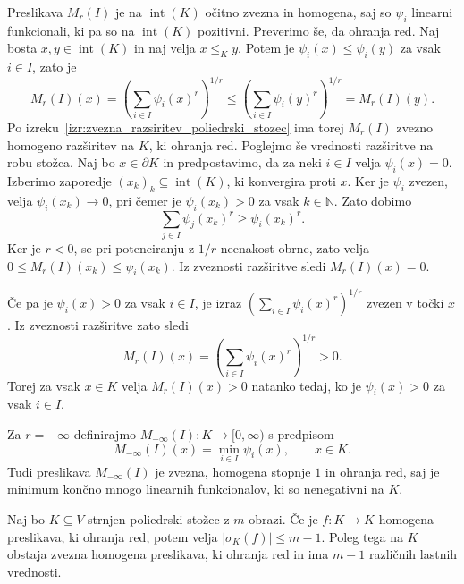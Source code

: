 \documentclass[mat2, tisk]{fmfdelo}
\newcommand{\N}{\mathbb{N}}
\begin{document}
Preslikava $M_r(I)$ je na $\operatorname{int}(K)$ očitno zvezna in homogena, saj so 
$\psi_i$ linearni funkcionali, ki pa so na $\operatorname{int}(K)$ pozitivni.
Preverimo še, da ohranja red. Naj bosta $x,y\in\operatorname{int}(K)$ in naj velja $x\leq_K y$. Potem je $\psi_i(x)\leq\psi_i(y)$ za vsak $i\in I$, zato je
\[
M_r(I)(x)
=
\left(\sum_{i\in I}\psi_i(x)^r\right)^{ 1/r}
\leq
\left(\sum_{i\in I}\psi_i(y)^r\right)^{1/r}
=
M_r(I)(y).
\]
Po izreku~\ref{izr:zvezna_razsiritev_poliedrski_stozec} ima torej $M_r(I)$
zvezno homogeno razširitev na $K$, ki ohranja red.
Poglejmo še vrednosti razširitve na robu stožca. Naj bo $x\in\partial K$
in predpostavimo, da za neki $i\in I$ velja $\psi_i(x)=0$. Izberimo
zaporedje $(x_k)_k\subseteq\operatorname{int}(K)$, ki konvergira proti $x$.
Ker je $\psi_i$ zvezen, velja $\psi_i(x_k)\longrightarrow0$, pri čemer je
$\psi_i(x_k)>0$ za vsak $k\in\N$. Zato dobimo
\[
\sum_{j\in I}\psi_j(x_k)^r\geq\psi_i(x_k)^r.
\]
Ker je $r<0$, se pri potenciranju z $1/r$ neenakost obrne, zato velja
$0\leq M_r(I)(x_k)\leq\psi_i(x_k)$. Iz zveznosti razširitve sledi
$M_r(I)(x)=0$. 

Če pa je $\psi_i(x)>0$ za vsak $i\in I$, je izraz
$\left(\sum\limits_{i\in I}\psi_i(x)^r\right)^{1/r}$ zvezen v točki $x$.
Iz zveznosti razširitve zato sledi
\[
M_r(I)(x)=\left(\sum_{i\in I}\psi_i(x)^r\right)^{1/r}>0.
\]
Torej za vsak $x\in K$ velja $M_r(I)(x)>0$ natanko tedaj,
ko je $\psi_i(x)>0$ za vsak $i\in I$.

Za $r=-\infty$ definirajmo
$M_{-\infty}(I)\colon K\longrightarrow[0,\infty)$ s predpisom
\[
M_{-\infty}(I)(x)=\min_{i\in I}\psi_i(x),
\qquad x\in K.
\]
Tudi preslikava $M_{-\infty}(I)$ je zvezna, homogena
stopnje $1$ in ohranja red, saj je minimum končno mnogo
linearnih funkcionalov, ki so nenegativni na $K$.

\begin{izrek}\label{izrek:stevilo_lastnih_vrednosti_poliedrski}
Naj bo $K\subseteq V$ strnjen poliedrski stožec z $m$ obrazi. Če je
$f\colon K\longrightarrow K$ homogena preslikava, ki ohranja red, potem
velja $|\sigma_K(f)|\leq m-1$. Poleg tega na $K$ obstaja zvezna homogena
preslikava, ki ohranja red in ima $m-1$ različnih lastnih vrednosti.
\end{izrek}
\end{document}
